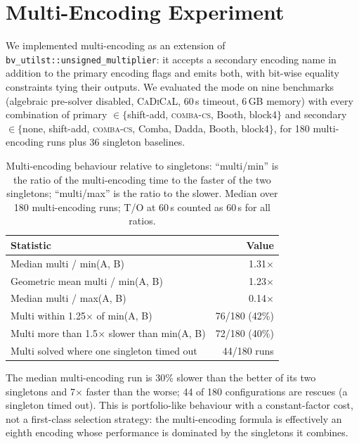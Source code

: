 \documentclass[a4paper]{ceurart}
\newcommand{\combacs}{\textsc{comba-cs}\xspace}
\newcommand{\cadical}{\textsc{CaDiCaL}\xspace}
\begin{document}


\newpage
\appendix

\section{Multi-Encoding Experiment}
\label{app:multi-encoding}

We implemented multi-encoding as an extension of
\texttt{bv\_utilst::unsigned\_multiplier}: it accepts a secondary
encoding name in addition to the primary encoding flags and emits
both, with bit-wise equality constraints tying their outputs.
We evaluated the mode on nine benchmarks (algebraic pre-solver
disabled, \cadical, 60\,s timeout, 6\,GB memory) with every
combination of primary $\in \{$shift-add, \combacs, Booth,
block4$\}$ and secondary $\in \{$none, shift-add, \combacs, Comba,
Dadda, Booth, block4$\}$, for 180 multi-encoding runs plus 36
singleton baselines.

\begin{table}[ht]
\caption{Multi-encoding behaviour relative to singletons:
  ``multi/min'' is the ratio of the multi-encoding time to the
  faster of the two singletons; ``multi/max'' is the ratio to
  the slower. Median over 180 multi-encoding runs; T/O at 60\,s
  counted as 60\,s for all ratios.}
\label{tab:multi-enc}
\centering
\begin{tabular}{lr}
\toprule
Statistic & Value \\
\midrule
Median multi / min(A, B) & 1.31$\times$ \\
Geometric mean multi / min(A, B) & 1.23$\times$ \\
Median multi / max(A, B) & 0.14$\times$ \\
Multi within 1.25$\times$ of min(A, B) & 76/180 (42\%) \\
Multi more than 1.5$\times$ slower than min(A, B) & 72/180 (40\%) \\
Multi solved where one singleton timed out & 44/180 runs \\
\bottomrule
\end{tabular}
\end{table}

The median multi-encoding run is 30\% slower than the better of
its two singletons and 7$\times$ faster than the worse; 44 of 180
configurations are rescues (a singleton timed out). This is
portfolio-like behaviour with a constant-factor cost, not a
first-class selection strategy: the multi-encoding formula is
effectively an eighth encoding whose performance is dominated by
the singletons it combines.
\end{document}
